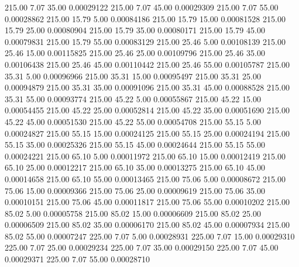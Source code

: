    215.00      7.07     35.00     0.00029122
    215.00      7.07     45.00     0.00029309
    215.00      7.07     55.00     0.00028862
    215.00     15.79      5.00     0.00084186
    215.00     15.79     15.00     0.00081528
    215.00     15.79     25.00     0.00080904
    215.00     15.79     35.00     0.00080171
    215.00     15.79     45.00     0.00079831
    215.00     15.79     55.00     0.00083129
    215.00     25.46      5.00     0.00108139
    215.00     25.46     15.00     0.00115825
    215.00     25.46     25.00     0.00109796
    215.00     25.46     35.00     0.00106438
    215.00     25.46     45.00     0.00110442
    215.00     25.46     55.00     0.00105787
    215.00     35.31      5.00     0.00096966
    215.00     35.31     15.00     0.00095497
    215.00     35.31     25.00     0.00094879
    215.00     35.31     35.00     0.00091096
    215.00     35.31     45.00     0.00088528
    215.00     35.31     55.00     0.00093774
    215.00     45.22      5.00     0.00055867
    215.00     45.22     15.00     0.00054455
    215.00     45.22     25.00     0.00052814
    215.00     45.22     35.00     0.00051690
    215.00     45.22     45.00     0.00051530
    215.00     45.22     55.00     0.00054708
    215.00     55.15      5.00     0.00024827
    215.00     55.15     15.00     0.00024125
    215.00     55.15     25.00     0.00024194
    215.00     55.15     35.00     0.00025326
    215.00     55.15     45.00     0.00024644
    215.00     55.15     55.00     0.00024221
    215.00     65.10      5.00     0.00011972
    215.00     65.10     15.00     0.00012419
    215.00     65.10     25.00     0.00012217
    215.00     65.10     35.00     0.00013275
    215.00     65.10     45.00     0.00014658
    215.00     65.10     55.00     0.00013465
    215.00     75.06      5.00     0.00008672
    215.00     75.06     15.00     0.00009366
    215.00     75.06     25.00     0.00009619
    215.00     75.06     35.00     0.00010151
    215.00     75.06     45.00     0.00011817
    215.00     75.06     55.00     0.00010202
    215.00     85.02      5.00     0.00005758
    215.00     85.02     15.00     0.00006609
    215.00     85.02     25.00     0.00006509
    215.00     85.02     35.00     0.00006170
    215.00     85.02     45.00     0.00007934
    215.00     85.02     55.00     0.00007247
    225.00      7.07      5.00     0.00028931
    225.00      7.07     15.00     0.00029310
    225.00      7.07     25.00     0.00029234
    225.00      7.07     35.00     0.00029150
    225.00      7.07     45.00     0.00029371
    225.00      7.07     55.00     0.00028710
